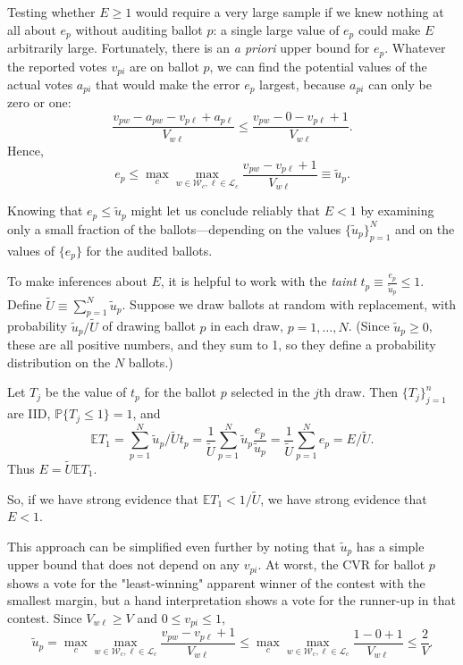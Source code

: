 Testing whether $E \ge 1$ would require a very large sample if we knew nothing at
all about $e_p$ without auditing ballot $p$: a single large value of $e_p$ could make
$E$ arbitrarily large.
Fortunately, there is an \emph{a priori} upper bound for $e_p$.
Whatever the reported votes $v_{pi}$ are on ballot $p$, we can find the
potential values of the actual votes $a_{pi}$ that would make the
error $e_p$ largest, because $a_{pi}$ can only be zero or one:
$$
    \frac{v_{pw}-a_{pw} - v_{p\ell} + a_{p\ell}}{V_{w\ell}} \le 
    \frac{v_{pw}- 0 - v_{p\ell} + 1}{V_{w\ell}}.
$$
Hence,
$$
    e_p \le \max_c \max_{w \in \mathcal{W}_c, \ell \in \mathcal{L}_c} 
    \frac{v_{pw} - v_{p\ell} + 1}{V_{w\ell}} \equiv \tilde{u}_p.
$$

Knowing that $e_p \le \tilde{u}_p$ might let us conclude reliably that $E < 1$
by examining only a small fraction of the ballots---depending on the 
values $\{ \tilde{u}_p\}_{p=1}^N$ and on the values of $\{e_p\}$ for the audited ballots.

To make inferences about $E$, it is helpful to work with the \emph{taint} $t_p \equiv \frac{e_p}{\tilde{u}_p} \le 1$.
Define $\tilde{U} \equiv \sum_{p=1}^N \tilde{u}_p$.
Suppose we draw ballots at random with replacement, with probability $\tilde{u}_p/\tilde{U}$
of drawing ballot $p$ in each draw, $p = 1, \ldots, N$.
(Since $\tilde{u}_p \ge 0$, these are all positive numbers, and they sum to 1,
so they define a probability distribution on the $N$ ballots.)

Let $T_j$ be the value of $t_p$ for the ballot $p$ selected in the $j$th draw.
Then $\{T_j\}_{j=1}^n$ are IID, $\mathbb{P} \{T_j \le 1\} = 1$, and
$$
  \mathbb{E} T_1 = \sum_{p=1}^N \tilde{u}_p/\tilde{U} t_p =
  \frac{1}{\tilde{U}}\sum_{p=1}^N \tilde{u}_p \frac{e_p}{\tilde{u}_p} = 
  \frac{1}{\tilde{U}} \sum_{p=1}^N e_p = E/\tilde{U}.
$$
Thus $E = \tilde{U} \mathbb{E} T_1$. 

So, if we have strong evidence that
$\mathbb{E} T_1 < 1/\tilde{U}$, we have
strong evidence that $E < 1$.

This approach can be simplified even further by noting that $\tilde{u}_p$ has
a simple upper bound that does not depend on any $v_{pi}$.
At worst, the CVR for ballot $p$ shows a vote for the "least-winning" apparent winner of the contest with the smallest margin, but a hand interpretation shows a vote for the runner-up in
that contest.
Since $V_{w\ell} \ge V$ and $0 \le v_{pi} \le 1$,
$$ 
   \tilde{u}_p = \max_c \max_{w \in \mathcal{W}_c, \ell \in \mathcal{L}_c} 
    \frac{v_{pw} - v_{p\ell} + 1}{V_{w\ell}}
    \le \max_c \max_{w \in \mathcal{W}_c, \ell \in \mathcal{L}_c} 
    \frac{1 - 0 + 1}{V_{w\ell}}
    \le \frac{2}{V}.
$$

